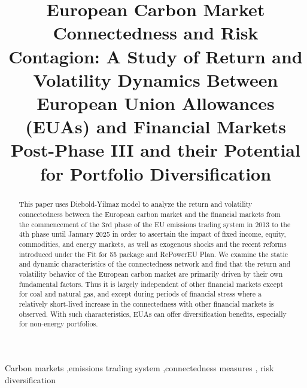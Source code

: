 \documentclass[preprint, 3p,
authoryear]{elsarticle} %
\begin{document}
\begin{frontmatter}

  \title{European Carbon Market Connectedness and Risk Contagion: A
Study of Return and Volatility Dynamics Between European Union
Allowances (EUAs) and Financial Markets Post-Phase III and their
Potential for Portfolio Diversification}
  
  \begin{abstract}
  This paper uses Diebold-Yilmaz model to analyze the return and
  volatility connectedness between the European carbon market and the
  financial markets from the commencement of the 3rd phase of the EU
  emissions trading system in 2013 to the 4th phase until January 2025
  in order to ascertain the impact of fixed income, equity, commodities,
  and energy markets, as well as exogenous shocks and the recent reforms
  introduced under the Fit for 55 package and RePowerEU Plan. We examine
  the static and dynamic characteristics of the connectedness network
  and find that the return and volatility behavior of the European
  carbon market are primarily driven by their own fundamental factors.
  Thus it is largely independent of other financial markets except for
  coal and natural gas, and except during periods of financial stress
  where a relatively short-lived increase in the connectedness with
  other financial markets is observed. With such characteristics, EUAs
  can offer diversification benefits, especially for non-energy
  portfolios.
  \end{abstract}
    \begin{keyword}
    Carbon markets \sep emissions trading system \sep connectedness
measures \sep 
    risk diversification
  \end{keyword}
  
 \end{frontmatter}

\newpage

\appendix
\end{document}
